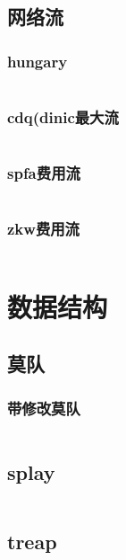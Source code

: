 \documentclass{article}
\begin{document}
\subsection{网络流}
\subsubsection{hungary} %
\inputminted[breaklines]{c++}{../图论/hungary.cpp} %

\subsubsection{cdq(dinic最大流}
\inputminted[breaklines]{c++}{../图论/dinic最大流.cpp}

\subsubsection{spfa费用流} %
\inputminted[breaklines]{c++}{../图论/spfa费用流.cpp} %

\subsubsection{zkw费用流} %
\inputminted[breaklines]{c++}{../图论/zkw费用流.cpp} %

\newpage
\section{数据结构}
\subsection{莫队}
\subsubsection{带修改莫队}
\inputminted[breaklines]{c++}{../数据结构/带修改莫队.cpp}

\subsection{splay}
\inputminted[breaklines]{c++}{../数据结构/splay.cpp}

\subsection{treap}
\inputminted[breaklines]{c++}{../数据结构/treap.cpp}
\end{document}
